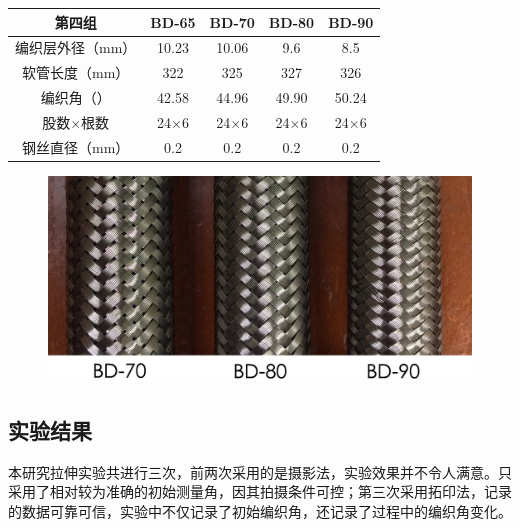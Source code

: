   \begin{table}[!htb]
  	\centering
  	\begin{tabular*}{0.8\textwidth}{@{\extracolsep{\fill}}>{\hspace{0.5cm}}ccccc}
  		\toprule
  		\textbf{第四组}          &     BD-65     &     BD-70     &     BD-80     &     BD-90     \\ \midrule
  		编织层外径（mm）  & 10.23      &     10.06     &      9.6      &      8.5        \\
  		软管长度（mm）    & 322       &      325      &      327      &      326        \\
  		编织角（\textdegree）& 42.58 &     44.96     &     49.90     &     50.24       \\
  		股数$ \times $根数        & 24$ \times $6 & 24$ \times $6 & 24$ \times $6 & 24$ \times $6 \\
  		钢丝直径（mm）              &      0.2      &      0.2      &      0.2      &      0.2      \\ \bottomrule
  	\end{tabular*} 
  \end{table}


\begin{figure}
\centering
\includegraphics[height=0.25\textheight]{figure/experiment/18mm-hose-specimen}
\label{fig:Slice1}
\end{figure}


\subsection{实验结果}
本研究拉伸实验共进行三次，前两次采用的是摄影法，实验效果并不令人满意。只采用了相对较为准确的初始测量角，因其拍摄条件可控；第三次采用拓印法，记录的数据可靠可信，实验中不仅记录了初始编织角，还记录了过程中的编织角变化。

